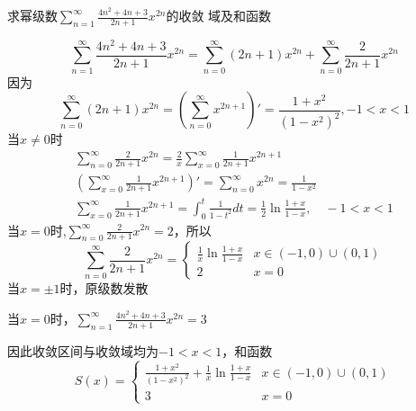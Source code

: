 \documentclass{article}
\begin{document}
\begin{examplle}[]
求幂级数\(\displaystyle\sum_{n=1}^\infty\frac{4n^2+4n+3}{2n+1}x^{2n}\)的收敛
域及和函数

\begin{equation*}
\sum_{n=1}^\infty\frac{4n^2+4n+3}{2n+1}x^{2n}=
\sum_{n=0}^\infty(2n+1)x^{2n}+\sum_{n=0}^\infty\frac{2}{2n+1}x^{2n}
\end{equation*}
因为
\begin{equation*}
\sum_{n=0}^\infty(2n+1)x^{2n}=\left(\sum_{n=0}^\infty x^{2n+1}\right)'=
\frac{1+x^2}{(1-x^2)^2},-1<x<1
\end{equation*}
当\(x\neq0\)时
\begin{gather*}
\sum_{n=0}^\infty\frac{2}{2n+1}x^{2n}=
\frac{2}{x}\sum_{x=0}^\infty\frac{1}{2n+1}x^{2n+1}\\
\left(\sum_{x=0}^\infty\frac{1}{2n+1}x^{2n+1}\right)'=
\sum_{n=0}^\infty x^{2n}=\frac{1}{1-x^2}\\
\sum_{x=0}^\infty\frac{1}{2n+1}x^{2n+1}=
\int_0^t\frac{1}{1-t^2}dt=\frac{1}{2}\ln\frac{1+x}{1-x},\quad -1<x<1
\end{gather*}
当\(x=0\)时,\(\displaystyle\sum_{n=0}^\infty\frac{2}{2n+1}x^{2n}=2\)，所以
\begin{equation*}
\sum_{n=0}^\infty\frac{2}{2n+1}x^{2n}=
\begin{cases}
\frac{1}{x}\ln\frac{1+x}{1-x}&x\in(-1,0)\cup(0,1)\\
2&x=0
\end{cases}
\end{equation*}
当\(x=\pm1\)时，原级数发散

当\(x=0\)时，\(\displaystyle\sum_{n=1}^\infty\frac{4n^2+4n+3}{2n+1}x^{2n}=3\)

因此收敛区间与收敛域均为\(-1<x<1\)，和函数
\begin{equation*}
S(x)=
\begin{cases}
\frac{1+x^2}{(1-x^2)^2}+\frac{1}{x}\ln\frac{1+x}{1-x}&x\in(-1,0)\cup(0,1)\\
3&x=0
\end{cases}
\end{equation*}
\end{examplle}
\end{document}
